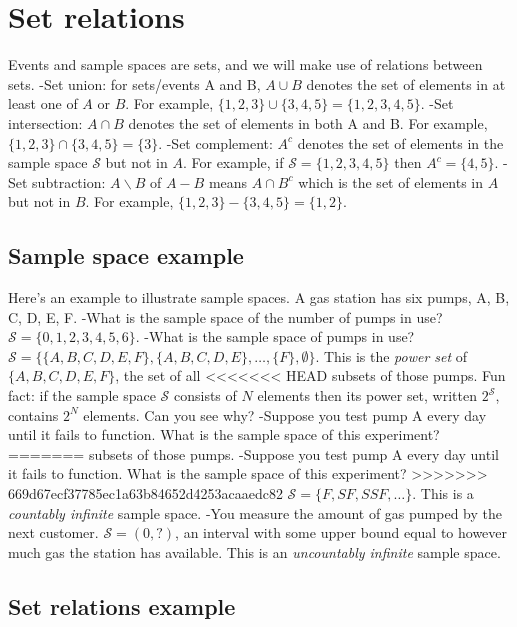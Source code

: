 \documentclass[]{book}
\begin{document}
\section{Set relations}\label{set-relations}

Events and sample spaces are sets, and we will make use of relations
between sets. -Set union: for sets/events A and B, \(A\cup B\) denotes
the set of elements in at least one of \(A\) or \(B\). For example,
\(\{1,2,3\}\cup\{3,4,5\} = \{1,2,3,4,5\}\). -Set intersection:
\(A\cap B\) denotes the set of elements in both A and B. For example,
\(\{1,2,3\}\cap\{3,4,5\} = \{3\}\). -Set complement: \(A^c\) denotes the
set of elements in the sample space \(\mathcal{S}\) but not in \(A\).
For example, if \(\mathcal{S} = \{1,2,3,4,5\}\) then \(A^c = \{4,5\}\).
-Set subtraction: \(A\backslash B\) of \(A-B\) means \(A\cap B^c\) which
is the set of elements in \(A\) but not in \(B\). For example,
\(\{1,2,3\}-\{3,4,5\} = \{1,2\}\).\\

\subsection{Sample space example}\label{sample-space-example}

Here's an example to illustrate sample spaces. A gas station has six
pumps, A, B, C, D, E, F. -What is the sample space of the number of
pumps in use? \(\mathcal{S} =\{0,1,2,3,4,5,6\}\). -What is the sample
space of pumps in use?
\(\mathcal{S} = \{\{A,B,C,D,E,F\},\{A,B,C,D,E\}, \ldots,\{F\}, \emptyset \}\).
This is the \emph{power set} of \(\{A,B,C,D,E,F\}\), the set of all
<<<<<<< HEAD
subsets of those pumps. Fun fact: if the sample space \(\mathcal{S}\)
consists of \(N\) elements then its power set, written
\(2^{\mathcal{S}}\), contains \(2^N\) elements. Can you see why?
-Suppose you test pump A every day until it fails to function. What is
the sample space of this experiment?
=======
subsets of those pumps. -Suppose you test pump A every day until it
fails to function. What is the sample space of this experiment?
>>>>>>> 669d67ecf37785ec1a63b84652d4253acaaedc82
\(\mathcal{S} = \{F, SF, SSF, \ldots \}\). This is a \emph{countably
infinite} sample space. -You measure the amount of gas pumped by the
next customer. \(\mathcal{S} = (0, ?)\), an interval with some upper
bound equal to however much gas the station has available. This is an
\emph{uncountably infinite} sample space.

\subsection{Set relations example}\label{set-relations-example}
\end{document}
